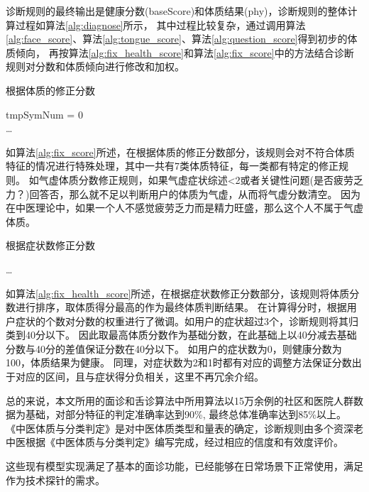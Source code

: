 诊断规则的最终输出是健康分数(baseScore)和体质结果(phy)，诊断规则的整体计算过程如算法\ref{alg:diagnose}所示，
其中过程比较复杂，通过调用算法\ref{alg:face_score}、算法\ref{alg:tongue_score}、算法\ref{alg:question_score}得到初步的体质倾向，
再按算法\ref{alg:fix_health_score}和算法\ref{alg:fix_score}中的方法结合诊断规则对分数和体质倾向进行修改和加权。

\begin{algorithm}[htbp]
\caption{根据体质的修正分数\cite{张红凯2018基于舌}}%
\label{alg:fix_score}
\LinesNumbered %
tmpSymNum = 0\\
\ldots\\
\end{algorithm}
如算法\ref{alg:fix_score}所述，在根据体质的修正分数部分，该规则会对不符合体质特征的情况进行特殊处理，其中一共有7类体质特征，每一类都有特定的修正规则。
如气虚体质分数修正规则，如果气虚症状综述<2或者关键性问题(是否疲劳乏力？)回答否，那么就不足以判断用户的体质为气虚，从而将气虚分数清空。
因为在中医理论中，如果一个人不感觉疲劳乏力而是精力旺盛，那么这个人不属于气虚体质。

\begin{algorithm}[htbp]
\caption{根据症状数修正分数\cite{张红凯2018基于舌}}%
\label{alg:fix_health_score}
\LinesNumbered %
\ldots\\
\end{algorithm}
如算法\ref{alg:fix_health_score}所述，在根据症状数修正分数部分，该规则将体质分数进行排序，取体质得分最高的作为最终体质判断结果。
在计算得分时，根据用户症状的个数对分数的权重进行了微调。如用户的症状超过3个，诊断规则将其归类到40分以下。
因此取最高体质分数作为基础分数，在此基础上以40分减去基础分数与40分的差值保证分数在40分以下。
如用户的症状数为0，则健康分数为100，体质结果为健康。
同理，对症状数为2和1时都有对应的调整方法保证分数出于对应的区间，且与症状得分负相关，这里不再冗余介绍。

总的来说，本文所用的面诊和舌诊算法中所用算法以15万余例的社区和医院人群数据为基础，对部分特征的判定准确率达到90\%, 最终总体准确率达到85\%以上\cite{Zhang2018Study, Zhao2014Qualitative, 李雪2016}。
《中医体质与分类判定》是对中医体质类型和量表的确定，诊断规则由多个资深老中医根据《中医体质与分类判定》编写完成，经过相应的信度和有效度评价\cite{朱燕波2006中医体质量表性能的初步评价,Zhang2018Study}。

这些现有模型实现满足了基本的面诊功能，已经能够在日常场景下正常使用，满足作为技术探针的需求。
